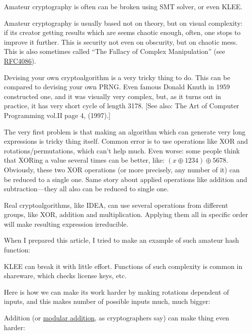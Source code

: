 Amateur cryptography is often can be broken using SMT solver, or even KLEE.

Amateur cryptography is usually based not on theory, but on visual complexity:
if its creator getting results which are seems chaotic enough, often, one stops to improve it further.
This is security not even on obscurity, but on chaotic mess.
This is also sometimes called ``The Fallacy of Complex Manipulation''
(see \href{https://tools.ietf.org/html/rfc4086}{RFC4086}).

Devising your own cryptoalgorithm is a very tricky thing to do.
This can be compared to devising your own \ac{PRNG}.
Even famous Donald Knuth in 1959 constructed one, and it was visually very complex,
but, as it turns out in practice, it has very short cycle of length 3178.
[See also: The Art of Computer Programming vol.II page 4, (1997).]

The very first problem is that making an algorithm which can generate very long expressions is tricky thing itself.
Common error is to use operations like XOR and rotations/permutations, which can't help much.
Even worse: some people think that XORing a value several times can be better, like: $(x \oplus 1234) \oplus 5678$.
Obviously, these two XOR operations (or more precisely, any number of it) can be reduced to a single one.
Same story about applied operations like addition and subtraction---they all also can be reduced to single one.

Real cryptoalgorithms, like IDEA, can use several operations from different groups, like XOR, addition and multiplication.
Applying them all in specific order will make resulting expression irreducible.

When I prepared this article, I tried to make an example of such amateur hash function:



KLEE can break it with little effort.
Functions of such complexity is common in shareware, which checks license keys, etc.

Here is how we can make its work harder by making rotations dependent of inputs,
and this makes number of possible inputs much, much bigger:



Addition (or \href{https://yurichev.com/blog/modulo/}{modular addition}, as cryptographers say) can make thing even harder:



